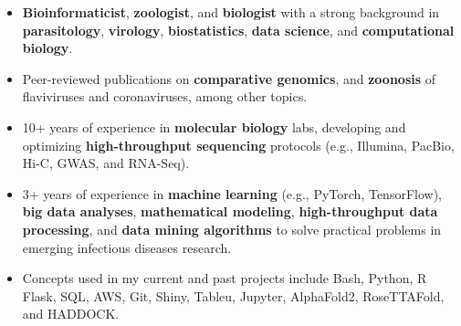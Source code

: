 \documentclass[11pt, letterpaper, sans]{moderncv}
\begin{document}
    \thispagestyle{empty}
    \maketitle


\vspace{-4.5em}

\begin{itemize}[itemsep=0in, labelindent=0in, leftmargin=*]


\item \textbf{Bioinformaticist}, \textbf{zoologist}, and \textbf{biologist} with a strong background in \textbf{parasitology}, \textbf{virology}, \textbf{biostatistics}, \textbf{data science}, and \textbf{computational biology}.

\item Peer-reviewed publications on \textbf{comparative genomics}, and \textbf{zoonosis} of flaviviruses and coronaviruses, among other topics.

\item 10+ years of experience in \textbf{molecular biology} labs, developing and optimizing \textbf{high-throughput sequencing} protocols (e.g., Illumina, PacBio, Hi-C, GWAS, and RNA-Seq).

\item 3+ years of experience in \textbf{machine learning} (e.g., PyTorch, TensorFlow), \textbf{big data analyses}, \textbf{mathematical modeling}, \textbf{high-throughput data processing}, and \textbf{data mining algorithms} to solve practical problems in emerging infectious diseases research.

\item Concepts used in my current and past projects include Bash, Python, R Flask, SQL, AWS, Git, Shiny, Tableu, Jupyter, AlphaFold2, RoseTTAFold, and HADDOCK.

\end{itemize}
\end{document}
